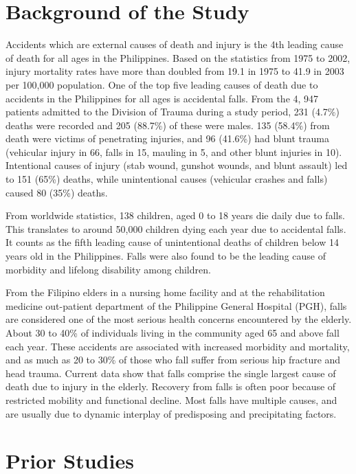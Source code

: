 \section{Background of the Study}

Accidents which are external causes of death and injury is the 4th leading cause of death for all ages in the Philippines. Based on the statistics from 1975 to 2002, injury mortality rates have more than doubled from 19.1 in 1975 to 41.9 in 2003 per 100,000 population. One of the top five leading causes of death due to accidents in the Philippines for all ages is accidental falls. From the 4, 947 patients admitted to the Division of Trauma during a study period, 231 (4.7\%) deaths were recorded and 205 (88.7\%) of these were males. 135 (58.4\%) from death were victims of penetrating injuries, and 96 (41.6\%) had blunt trauma (vehicular injury in 66, falls in 15, mauling in 5, and other blunt injuries in 10). Intentional causes of injury (stab wound, gunshot wounds, and blunt assault) led to 151 (65\%) deaths, while unintentional causes (vehicular crashes and falls) caused 80 (35\%) deaths. \cite{Mar11} %

From worldwide statistics, 138 children, aged 0 to 18 years die daily due to falls. This translates to around 50,000 children dying each year due to accidental falls. It counts as the fifth leading cause of unintentional deaths of children below 14 years old in the Philippines. Falls were also found to be the leading cause of morbidity and lifelong disability among children. \cite{Cri14} %

From the Filipino elders in a nursing home facility and at the rehabilitation medicine out-patient department of the Philippine General Hospital (PGH), falls are considered one of the most serious health concerns encountered by the elderly. About 30 to 40\% of individuals living in the community aged 65 and above fall each year. These accidents are associated with increased morbidity and mortality, and as much as 20 to 30\% of those who fall suffer from serious hip fracture and head trauma. Current data show that falls comprise the single largest cause of death due to injury in the elderly. Recovery from falls is often poor because of restricted mobility and functional decline. Most falls have multiple causes, and are usually due to dynamic interplay of predisposing and precipitating factors. \cite{Gue} %

\section{Prior Studies}


